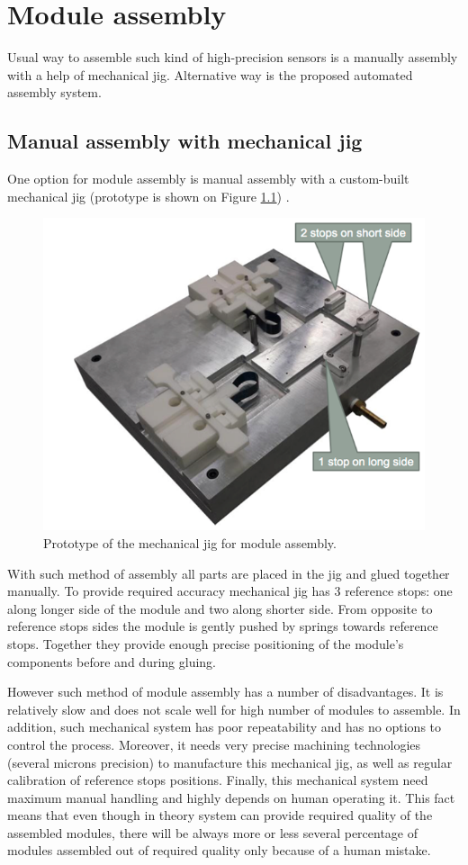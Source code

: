 \chapter{Module assembly}

Usual way to assemble such kind of high-precision sensors is a manually assembly with a help of mechanical jig. Alternative way is the proposed automated assembly system.

\section{Manual assembly with mechanical jig}

One option for module assembly is manual assembly with a custom-built mechanical jig (prototype is shown on Figure \ref{fig:mechanical_jig}) \cite{Automated_assembly_slides}.

\begin{figure}[ht]\centering
\includegraphics[width=0.7\linewidth]{Data/Module_assembly/Mechanical_jig.png}
\caption{Prototype of the mechanical jig for module assembly.}
\label{fig:mechanical_jig}
\end{figure}

With such method of assembly all parts are placed in the jig and glued together manually. To provide required accuracy mechanical jig has 3 reference stops: one along longer side of the module and two along shorter side. From opposite to reference stops sides the module is gently pushed by springs towards reference stops. Together they provide enough precise positioning of the module's components before and during gluing.

However such method of module assembly has a number of disadvantages. It is relatively slow and does not scale well for high number of modules to assemble. In addition, such mechanical system has poor repeatability and has no options to control the process. Moreover, it needs very precise machining technologies (several microns precision) to manufacture this mechanical jig, as well as regular calibration of reference stops positions. Finally, this mechanical system need maximum manual handling and highly depends on human operating it. This fact means that even though in theory system can provide required quality of the assembled modules, there will be always more or less several percentage of modules assembled out of required quality only because of a human mistake.

